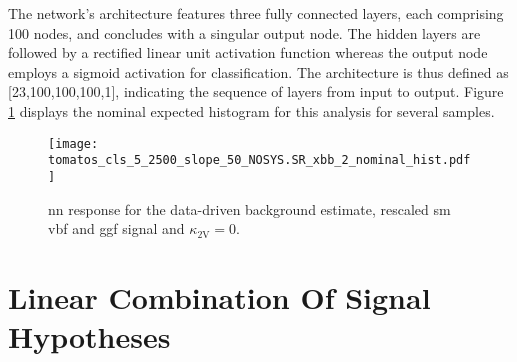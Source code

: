 The network's architecture features three fully connected layers, each comprising 100 nodes, and concludes with a singular output node. The hidden layers are followed by a rectified linear unit activation function whereas the output node employs a sigmoid activation for classification. The architecture is thus defined as [23,100,100,100,1], indicating the sequence of layers from input to output. Figure \ref{fig:nominal-hist} displays the nominal expected histogram for this analysis for several samples.

\begin{figure}
    \centering
    \texttt{[image: tomatos\_cls\_5\_2500\_slope\_50\_NOSYS.SR\_xbb\_2\_nominal\_hist.pdf]}
    \caption[]{\ac{nn} response for the data-driven background estimate, rescaled \ac{sm}  \ac{vbf} and \ac{ggf} signal and $\kappa_\text{2V}=0$.}
    \label{fig:nominal-hist}
\end{figure}


\section{Linear Combination Of Signal Hypotheses}\label{sec:linear_combination}

